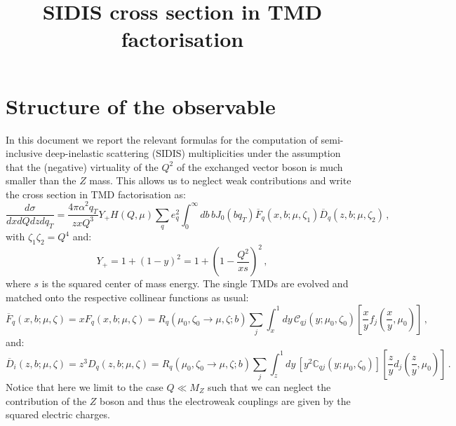 \documentclass[10pt,a4paper]{article}
\begin{document}
\title{SIDIS cross section in TMD factorisation}


\maketitle

\tableofcontents{}

\section{Structure of the observable}

In this document we report the relevant formulas for the computation
of semi-inclusive deep-inelastic scattering (SIDIS) multiplicities
under the assumption that the (negative) virtuality of the $Q^2$ of
the exchanged vector boson is much smaller than the $Z$ mass. This
allows us to neglect weak contributions and write the cross section
in TMD factorisation as:
\begin{equation}
  \frac{d\sigma}{dxdQdz d q_T} = \frac{4\pi \alpha^2q_T}{z x Q^3}Y_+ H(Q,\mu) \sum_q e_q^2
  \int_0^\infty db \,b
  J_0\left(bq_T\right)\overline{F}_q(x,b;\mu,\zeta_1)
  \overline{D}_{q}(z,b;\mu,\zeta_2)\,,
\label{eq:sidisxsec}
\end{equation}
with $\zeta_1\zeta_2=Q^4$ and:
\begin{equation}
  Y_+=1+(1-y)^2=1+\left(1-\frac{Q^2}{xs}\right)^2\,,
\end{equation}
where $s$ is the squared center of mass energy. The single TMDs are
evolved and matched onto the respective collinear functions as usual:
\begin{equation}
\overline{F}_q(x,b;\mu,\zeta) =xF_q(x,b;\mu,\zeta) = R_q(\mu_0,\zeta_0\rightarrow \mu,\zeta;b) \sum_{j}\int_x^1dy\,\mathcal{C}_{qj}(y;\mu_0,\zeta_0)\left[\frac{x}{y}f_j\left(\frac{x}{y},\mu_0\right)\right]\,,
\end{equation}
and:
\begin{equation}
\overline{D}_{i}(z,b;\mu,\zeta) =z^3D_{q}(z,b;\mu,\zeta) = R_q(\mu_0,\zeta_0\rightarrow \mu,\zeta;b) \sum_{j}\int_z^1dy\,\left[y^2\mathbb{C}_{qj}(y;\mu_0,\zeta_0)\right]\left[\frac{z}{y}d_j\left(\frac{z}{y},\mu_0\right)\right]\,.
\end{equation}
Notice that here we limit to the case $Q\ll M_Z$ such that we can
neglect the contribution of the $Z$ boson and thus the electroweak
couplings are given by the squared electric charges.
\end{document}
